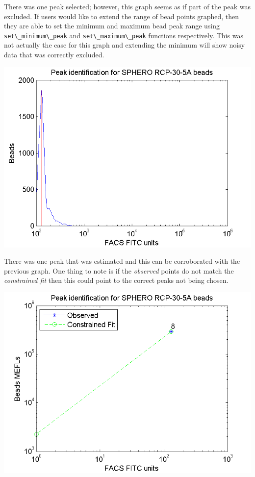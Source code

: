 There was one peak selected; however, this graph seems as if part of the peak was excluded. If users would like to extend the range of bead points graphed, then they are able to set the minimum and maximum bead peak range using \lstinline+set\_minimum\_peak+ and \lstinline+set\_maximum\_peak+ functions respectively. This was not actually the case for this graph and extending the minimum will show noisy data that was correctly excluded.   

\begin{center}
  \includegraphics[width=.90\textwidth]{figures/bead-calibration}
\end{center}

There was one peak that was estimated and this can be corroborated with the previous graph. One thing to note is if the \textit{observed} points do not match the \textit{constrained fit} then this could point to the correct peaks not being chosen. 

\begin{center}
  \includegraphics[width=.90\textwidth]{figures/bead-fit-curve}
\end{center}

